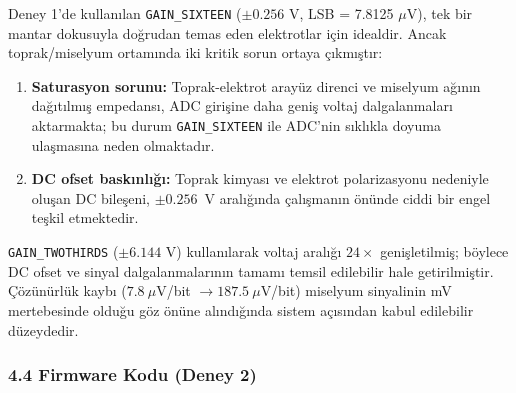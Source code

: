 \documentclass[11pt,a4paper]{article}
\begin{document}
Deney 1'de kullanılan \texttt{GAIN\_SIXTEEN} ($\pm 0.256$ V, LSB = 7.8125 $\mu$V), tek bir mantar dokusuyla doğrudan temas eden elektrotlar için idealdir. Ancak toprak/miselyum ortamında iki kritik sorun ortaya çıkmıştır:
\begin{enumerate}[leftmargin=1.2cm]
  \item \textbf{Saturasyon sorunu:} Toprak-elektrot arayüz direnci ve miselyum ağının dağıtılmış empedansı, ADC girişine daha geniş voltaj dalgalanmaları aktarmakta; bu durum \texttt{GAIN\_SIXTEEN} ile ADC'nin sıklıkla doyuma ulaşmasına neden olmaktadır.
  \item \textbf{DC ofset baskınlığı:} Toprak kimyası ve elektrot polarizasyonu nedeniyle oluşan DC bileşeni, $\pm 0.256$~V aralığında çalışmanın önünde ciddi bir engel teşkil etmektedir.
\end{enumerate}

\texttt{GAIN\_TWOTHIRDS} ($\pm 6.144$ V) kullanılarak voltaj aralığı $24\times$ genişletilmiş; böylece DC ofset ve sinyal dalgalanmalarının tamamı temsil edilebilir hale getirilmiştir. Çözünürlük kaybı ($7.8~\mu$V/bit $\rightarrow 187.5~\mu$V/bit) miselyum sinyalinin mV mertebesinde olduğu göz önüne alındığında sistem açısından kabul edilebilir düzeydedir.

\subsubsection*{4.4 Firmware Kodu (Deney 2)}
\end{document}
